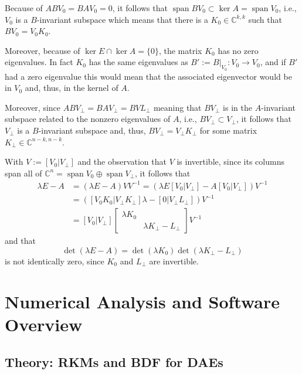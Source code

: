 \documentclass[]{book}
\theoremstyle{definition}
\theoremstyle{definition}
\theoremstyle{definition}
\theoremstyle{definition}
\theoremstyle{remark}
\begin{document}
Because of \(ABV_0=BAV_0=0\), it follows that \(\operatorname{span}BV_0 \subset \ker A = \operatorname{span}V_0\), i.e., \(V_0\) is a \(B\)-invariant subspace which means that there is a \(K_0\in \mathbb C^{k,k}\) such that \(BV_0 =V_0K_0\).

Moreover, because of \(\ker E \cap \ker A = \{0\}\), the matrix \(K_0\) has no zero eigenvalues. In fact \(K_0\) has the same eigenvalues as \(B':=B\bigr|_{V_0}\colon V_0 \to V_0\), and if \(B'\) had a zero eigenvalue this would mean that the associated eigenvector would be in \(V_0\) and, thus, in the kernel of \(A\).

Moreover, since \(ABV_\perp=BAV_\perp=BVL_\perp\) meaning that \(BV_\perp\) is in the \(A\)-invariant subspace related to the nonzero eigenvalues of \(A\), i.e., \(BV_\perp \subset V_\perp\), it follows that \(V_\perp\) is a \(B\)-invariant subspace and, thus, \(BV_\perp = V_\perp K_\perp\) for some matrix \(K_\perp \in \mathbb C^{n-k,n-k}\).

With \(V:=[V_0 |V_\perp]\) and the observation that \(V\) is invertible, since its columns span all of \(\mathbb C^n = \operatorname{span}V_0 \oplus \operatorname{span}V_\perp\), it follows that
\begin{equation*}
\begin{split}
\lambda E - A & = (\lambda E - A)VV^{-1} = (\lambda E [V_0 |V_\perp]- A[V_0 |V_\perp])V^{-1}  \\
& = ([V_0 K_0 |V_\perp K_\perp]\lambda  - [0 |V_\perp L_\perp])V^{-1} \\
& = [V_0 |V_\perp ]
\begin{bmatrix}
 \lambda K_0 & \\ & \lambda K_\perp - L_\perp
\end{bmatrix}
V^{-1}
\end{split}
\end{equation*}
and that
\[
\det (\lambda E - A) = \det (\lambda K_0) \det(\lambda K_\perp - L_\perp) 
\]
is not identically zero, since \(K_0\) and \(L_\perp\) are invertible.

\hypertarget{numerical-analysis-and-software-overview}{%
\chapter{Numerical Analysis and Software Overview}\label{numerical-analysis-and-software-overview}}

\hypertarget{theory-rkms-and-bdf-for-daes}{%
\section{Theory: RKMs and BDF for DAEs}\label{theory-rkms-and-bdf-for-daes}}
\end{document}
